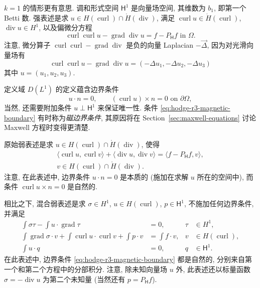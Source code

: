 {$k=1$ 的情形更有意思. 调和形式空间 $\mathsf H^1$ 是向量场空间, 其维数为 $b_1$, 即第一个 Betti 数. 强表述是求 $u\in H(\operatorname{curl})\cap\mathring H(\operatorname{div})$, 满足 $\operatorname{curl}u\in\mathring H(\operatorname{curl})$, $\operatorname{div}u\in H^1$, 以及偏微分方程}
\begin{equation}\label{eq:hodge-r3-vector-laplace}
\operatorname{curl}\operatorname{curl}u-\operatorname{grad}\operatorname{div}u=f-P_{\mathsf H}f\text{ in }\Omega.
\end{equation}
{注意, 微分算子 $\operatorname{curl}\operatorname{curl}-\operatorname{grad}\operatorname{div}$ 是负的向量 Laplacian $-\vec\Delta$, 因为对光滑向量场有 \[\operatorname{curl}\operatorname{curl}u-\operatorname{grad}\operatorname{div}u=(-\Delta u_1,-\Delta u_2,-\Delta u_3)\] 其中 $u=(u_1,u_2,u_3)$.}

{定义域 $D(L^1)$ 的定义蕴含边界条件}
\begin{equation}\label{eq:hodge-r3-magnetic-boundary}
u\cdot n=0,\qquad(\operatorname{curl}u)\times n=0\text{ on }\partial\Omega,
\end{equation}
{当然, 还需要附加条件 $u\perp\mathsf H^1$ 来保证唯一性. 条件 \eqref{eq:hodge-r3-magnetic-boundary} 有时称为\emph{磁边界条件}, 其原因将在 Section~\ref{sec:maxwell-equations} 讨论 Maxwell 方程时变得更清楚.}

{原始弱表述是求 $u\in H(\operatorname{curl})\cap\mathring H(\operatorname{div})$, 使得}
\begin{equation}\label{eq:hodge-r3-magnetic-primal}
\begin{gathered}
\langle\operatorname{curl}u,\operatorname{curl}v\rangle+\langle\operatorname{div}u,\operatorname{div}v\rangle=\langle f-P_{\mathsf H}f,v\rangle,\\
v\in H(\operatorname{curl})\cap\mathring H(\operatorname{div}).
\end{gathered}
\end{equation}
{注意, 在此表述中, 边界条件 $u\cdot n=0$ 是本质的 (施加在求解 $u$ 所在的空间中), 而条件 $\operatorname{curl}u\times n=0$ 是自然的.}

{相比之下, 混合弱表述是求 $\sigma\in H^1$, $u\in H(\operatorname{curl})$, $p\in\mathsf H^1$, 不施加任何边界条件, 并满足}
\begin{equation}\label{eq:hodge-r3-magnetic-mixed}
\begin{aligned}
\int\sigma\tau-\int u\cdot\operatorname{grad}\tau&=0,&\tau&\in H^1,\\
\int\operatorname{grad}\sigma\cdot v+\int\operatorname{curl}u\cdot\operatorname{curl}v+\int p\cdot v&=\int f\cdot v,&v&\in H(\operatorname{curl}),\\
\int u\cdot q&=0,&q&\in\mathsf H^1.
\end{aligned}
\end{equation}
{在此表述中, 边界条件 \eqref{eq:hodge-r3-magnetic-boundary} 都是自然的, 分别来自第一个和第二个方程中的分部积分. 注意, 除未知向量场 $u$ 外, 此表述还以标量函数 $\sigma=-\operatorname{div}u$ 为第二个未知量 (当然还有 $p=P_{\mathsf H}f$).}

